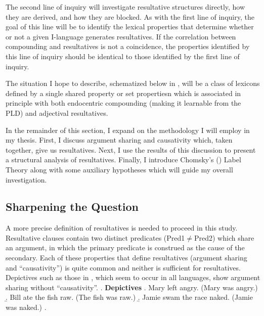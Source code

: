 \documentclass[letterpaper,12pt]{article}
\newcommand{\figex}{\refstepcounter{ExNo}\theExNo\hspace{\Exlabelsep}}
\begin{document}
The second line of inquiry will investigate resultative structures directly, how they are derived, and how they are blocked.
As with the first line of inquiry, the goal of this line will be to identify the lexical properties that determine whether or not a given I-language generates resultatives.
If the correlation between compounding and resultatives is not a coincidence, the properties identified by this line of inquiry should be identical to those identified by the first line of inquiry.

The situation I hope to describe, schematized below in \Next,  will be a class of lexicons defined by a single shared property or set propertiesn which is associated in principle with both endocentric compounding (making it learnable from the PLD) and adjectival resultatives. 
\begin{figure}[h]
  \figex
  \label{fig:ParameterModel}
\end{figure}

In the remainder of this section, I expand on the methodology I will employ in my thesis.
First, I discuss argument sharing and causativity which, taken together, give us resultatives.
Next, I use the results of this discussion to present a structural analysis of resultatives.
Finally, I introduce Chomsky's (\citeyear{chomsky2013problems,chomsky2015problems}) Label Theory along with some auxiliary hypotheses which will guide my overall investigation.

\subsection{Sharpening the Question}\label{sec:result analysis}
A more precise definition of resultatives is needed to proceed in this study.
Resultative clauses  contain two distinct predicates (Pred1$\neq$Pred2) which share an argument, in which the primary predicate is construed as the cause of the secondary.
Each of these properties that define resultatives (argument sharing and ``causativity'') is quite common and neither is sufficient for resultatives.
Depictives such as those in \Next, which seem to occur in all languages, show argument sharing without ``causativity''.
\ex. \textbf{Depictives}
\a. Mary left angry. (Mary was angry.)
\b. Bill ate the fish raw. (The fish was raw.)
\b. Jamie swam the race naked. (Jamie was naked.)
\z.
\end{document}
